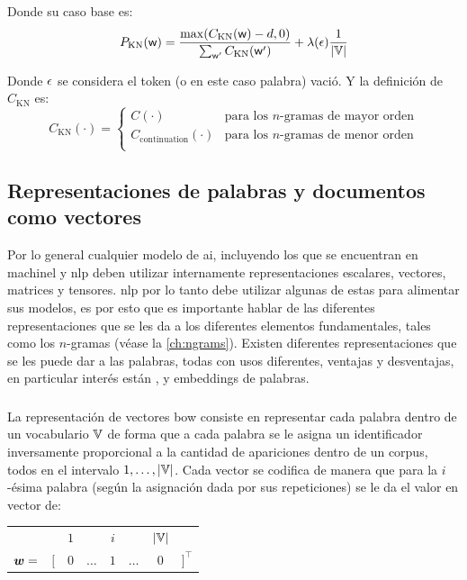 Donde su caso base es:
\begin{equation}
  P_{\mathrm{KN}}({\mathit{\mathsf{w}}}) = \frac{ \max(C_{\mathrm{KN}}({\mathit{\mathsf{w}}}) -d, 0) }{\sum_{{\mathit{\mathsf{w}}}^{\prime}} C_{\mathrm{KN}}({\mathit{\mathsf{w}}}^{\prime})} + \lambda({\epsilon}) \frac{1}{|{\mathbb{V}}|}
\end{equation}

Donde ${\epsilon}$ se considera el token (o en este caso palabra) vació. Y la definición de $C_{\mathrm{KN}}$ es:
\begin{equation}
  C_{\mathrm{KN}}(\cdot) = \left\{ \begin{array}{ll}
            C(\cdot) & \text{para los $n$-gramas de mayor orden} \\
            C_{\mathrm{continuation}}(\cdot) & \text{para los $n$-gramas de menor orden} \\
          \end{array} \right.
\end{equation}


\subsection{Representaciones de palabras y documentos como vectores} \label{ch:word-representations}
Por lo general cualquier modelo de \gls{ai}, incluyendo los que se encuentran en \gls{machinel} y \gls{nlp} deben utilizar internamente representaciones escalares, vectores, matrices y tensores. \gls{nlp} por lo tanto debe utilizar algunas de estas para alimentar sus modelos, es por esto que es importante hablar de las diferentes representaciones que se les da a los diferentes elementos fundamentales, tales como los $n$-gramas (véase la \cref{ch:ngrams}). Existen diferentes representaciones que se les puede dar a las palabras, todas con usos diferentes, ventajas y desventajas, en particular interés están ,  y embeddings de palabras.

\subsubsection{}
La representación de vectores \gls{bow} consiste en representar cada palabra dentro de un vocabulario ${\mathbb{V}}$ de forma que a cada palabra se le asigna un identificador inversamente proporcional a la cantidad de apariciones dentro de un \gls{corpus}, todos en el intervalo $1, \ldots, |{\mathbb{V}}|$. Cada vector se codifica de manera que para la $i$-ésima palabra (según la asignación dada por sus repeticiones) se le da el valor en vector de:
\begin{center}
\begin{tabular}{cccccccc}
           &     & $1$ &           & $i$   &          & $|{\mathbb{V}}|$ &  \\
  ${\bm{w}} = $ & $[$ & $0$ & $\ldots$  & $1$ & $\ldots$    & $0$ & $]^{\top}$
\end{tabular}
\end{center}

